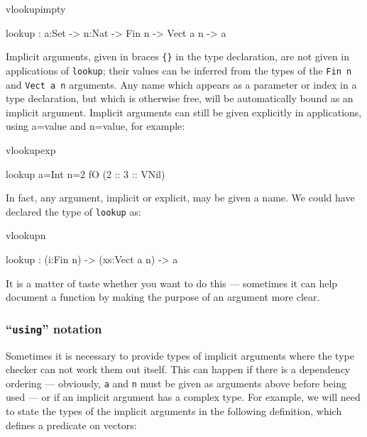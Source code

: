 \begin{SaveVerbatim}{vlookupimpty}

lookup : {a:Set} -> {n:Nat} -> Fin n -> Vect a n -> a

\end{SaveVerbatim}

\noindent
Implicit arguments, given in braces \texttt{\{\}} in the type declaration, are not given in
applications of \texttt{lookup}; their values can be inferred from the types of
the \texttt{Fin n} and \texttt{Vect a n} arguments. Any name which appears as a parameter
or index in a type declaration, but which is otherwise free, will be automatically
bound as an implicit argument.
Implicit arguments can still be given explicitly in applications, using
{a=value} and {n=value}, for example:

\begin{SaveVerbatim}{vlookupexp}

lookup {a=Int} {n=2} fO (2 :: 3 :: VNil)

\end{SaveVerbatim}

\noindent
In fact, any argument, implicit or explicit, may be given a name. We could have
declared the type of \texttt{lookup} as:

\begin{SaveVerbatim}{vlookupn}

lookup : (i:Fin n) -> (xs:Vect a n) -> a

\end{SaveVerbatim}

\noindent
It is a matter of taste whether you want to do this --- sometimes it can help
document a function by making the purpose of an argument more clear.

\subsubsection{``\texttt{using}'' notation}

Sometimes it is necessary to provide types of implicit arguments where
the type checker can not work them out itself. This can happen if there is a
dependency ordering --- obviously, \texttt{a} and \texttt{n} must be given as arguments above
before being used --- or if an implicit argument has a complex type. For example,
we will need to state the types of the implicit arguments in the following
definition, which defines a predicate on vectors:

